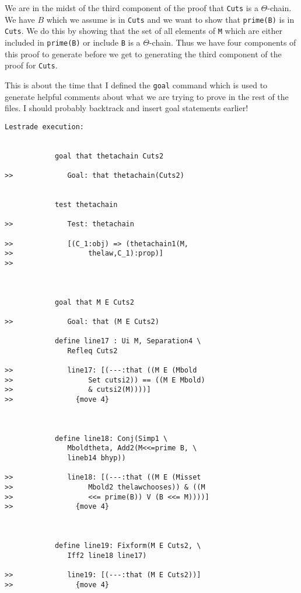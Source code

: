 \documentclass[12pt]{article}
\begin{document}
We are in the midst of the third component of the proof that {\tt Cuts} is a $\Theta$-chain.  We have $B$ which we assume is in {\tt Cuts}
and we want to show that {\tt prime(B)} is in {\tt Cuts}.  We do this by showing that the set of all elements of {\tt M} which are either included
in {\tt prime(B)} or include {\tt B} is a $\Theta$-chain.  Thus we have four components of this proof to generate before we get to generating the third component of
the proof for {\tt Cuts}.

This is about the time that I defined the {\tt goal} command which is used to generate helpful comments about what we are trying to prove in the rest of the files.  I should probably
backtrack and insert goal statements earlier!


\begin{verbatim}Lestrade execution:


            goal that thetachain Cuts2

>>             Goal: that thetachain(Cuts2)


            test thetachain

>>             Test: thetachain

>>             [(C_1:obj) => (thetachain1(M,
>>                  thelaw,C_1):prop)]
>>               



            goal that M E Cuts2

>>             Goal: that (M E Cuts2)

            define line17 : Ui M, Separation4 \
               Refleq Cuts2

>>             line17: [(---:that ((M E (Mbold
>>                  Set cutsi2)) == ((M E Mbold)
>>                  & cutsi2(M))))]
>>               {move 4}



            define line18: Conj(Simp1 \
               Mboldtheta, Add2(M<<=prime B, \
               lineb14 bhyp))

>>             line18: [(---:that ((M E (Misset
>>                  Mbold2 thelawchooses)) & ((M
>>                  <<= prime(B)) V (B <<= M))))]
>>               {move 4}



            define line19: Fixform(M E Cuts2, \
               Iff2 line18 line17)

>>             line19: [(---:that (M E Cuts2))]
>>               {move 4}


\end{verbatim}
\end{document}
